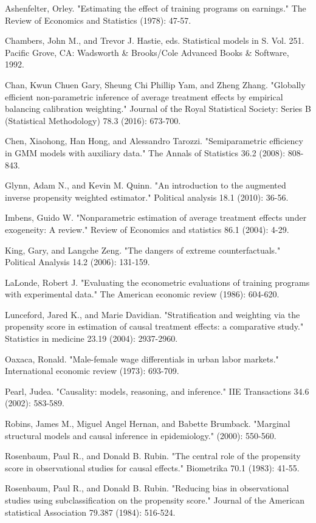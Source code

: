 \documentclass[12pt, oneside]{article}
\begin{document}
\begin{thebibliography}{5}
Ashenfelter, Orley. "Estimating the effect of training programs on earnings." The Review of Economics and Statistics (1978): 47-57.

Chambers, John M., and Trevor J. Hastie, eds. Statistical models in S. Vol. 251. Pacific Grove, CA: Wadsworth \& Brooks/Cole Advanced Books \& Software, 1992.

Chan, Kwun Chuen Gary, Sheung Chi Phillip Yam, and Zheng Zhang. "Globally efficient non‐parametric inference of average treatment effects by empirical balancing calibration weighting." Journal of the Royal Statistical Society: Series B (Statistical Methodology) 78.3 (2016): 673-700.

Chen, Xiaohong, Han Hong, and Alessandro Tarozzi. "Semiparametric efficiency in GMM models with auxiliary data." The Annals of Statistics 36.2 (2008): 808-843.

Glynn, Adam N., and Kevin M. Quinn. "An introduction to the augmented inverse propensity weighted estimator." Political analysis 18.1 (2010): 36-56.

Imbens, Guido W. "Nonparametric estimation of average treatment effects under exogeneity: A review." Review of Economics and statistics 86.1 (2004): 4-29.

King, Gary, and Langche Zeng. "The dangers of extreme counterfactuals." Political Analysis 14.2 (2006): 131-159.

LaLonde, Robert J. "Evaluating the econometric evaluations of training programs with experimental data." The American economic review (1986): 604-620.

Lunceford, Jared K., and Marie Davidian. "Stratification and weighting via the propensity score in estimation of causal treatment effects: a comparative study." Statistics in medicine 23.19 (2004): 2937-2960.

Oaxaca, Ronald. "Male-female wage differentials in urban labor markets." International economic review (1973): 693-709.

Pearl, Judea. "Causality: models, reasoning, and inference." IIE Transactions 34.6 (2002): 583-589.

Robins, James M., Miguel Angel Hernan, and Babette Brumback. "Marginal structural models and causal inference in epidemiology." (2000): 550-560.

Rosenbaum, Paul R., and Donald B. Rubin. "The central role of the propensity score in observational studies for causal effects." Biometrika 70.1 (1983): 41-55.
 
Rosenbaum, Paul R., and Donald B. Rubin. "Reducing bias in observational studies using subclassification on the propensity score." Journal of the American statistical Association 79.387 (1984): 516-524.

\end{thebibliography}
\end{document}
